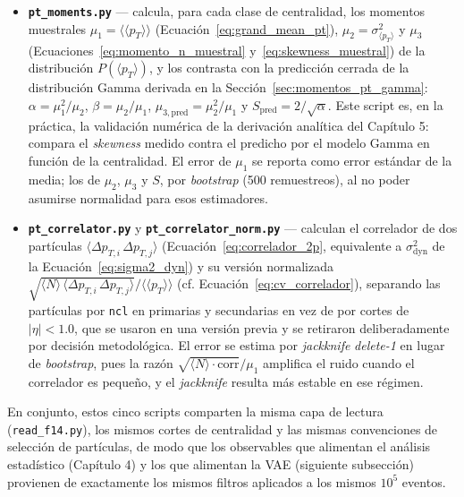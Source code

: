 \begin{itemize}
\item \textbf{\texttt{pt\_moments.py}} — calcula, para cada clase de
centralidad, los momentos muestrales $\mu_1=\langle\langle p_T\rangle\rangle$
(Ecuación~\ref{eq:grand_mean_pt}), $\mu_2=\sigma^2_{\langle p_T\rangle}$ y
$\mu_3$ (Ecuaciones~\ref{eq:momento_n_muestral}
y~\ref{eq:skewness_muestral}) de la distribución $P(\langle p_T\rangle)$, y
los contrasta con la predicción cerrada de la distribución Gamma derivada
en la Sección~\ref{sec:momentos_pt_gamma}: $\alpha=\mu_1^2/\mu_2$,
$\beta=\mu_2/\mu_1$, $\mu_{3,\text{pred}}=\mu_2^2/\mu_1$ y
$S_{\text{pred}}=2/\sqrt{\alpha}$. Este script es, en la práctica, la
validación numérica de la derivación analítica del Capítulo 5: compara el
\textit{skewness} medido contra el predicho por el modelo Gamma en función
de la centralidad. El error de $\mu_1$ se reporta como error estándar de la
media; los de $\mu_2$, $\mu_3$ y $S$, por \textit{bootstrap} (500
remuestreos), al no poder asumirse normalidad para esos estimadores.

\item \textbf{\texttt{pt\_correlator.py}} y \textbf{\texttt{pt\_correlator\_norm.py}}
— calculan el correlador de dos partículas $\langle \Delta p_{T,i}\,\Delta
p_{T,j}\rangle$ (Ecuación~\ref{eq:correlador_2p}, equivalente a
$\sigma^2_{\text{dyn}}$ de la Ecuación~\ref{eq:sigma2_dyn}) y su versión
normalizada $\sqrt{\langle N\rangle\,\langle \Delta p_{T,i}\,\Delta
p_{T,j}\rangle}/\langle\langle p_T\rangle\rangle$
(cf. Ecuación~\ref{eq:cv_correlador}), separando las partículas por
\texttt{ncl} en primarias y secundarias en vez de por cortes de
$|\eta|<1.0$, que se usaron en una versión previa y se retiraron
deliberadamente por decisión metodológica. El error se estima por
\textit{jackknife} \textit{delete-1} en lugar de \textit{bootstrap}, pues
la razón $\sqrt{\langle N\rangle\cdot\text{corr}}/\mu_1$ amplifica el
ruido cuando el correlador es pequeño, y el \textit{jackknife} resulta más
estable en ese régimen.

\end{itemize}

\noindent
En conjunto, estos cinco scripts comparten la misma capa de lectura
(\texttt{read\_f14.py}), los mismos cortes de centralidad y las mismas
convenciones de selección de partículas, de modo que los observables que
alimentan el análisis estadístico (Capítulo 4) y los que alimentan la VAE
(siguiente subsección) provienen de exactamente los mismos filtros
aplicados a los mismos $10^{5}$ eventos.

